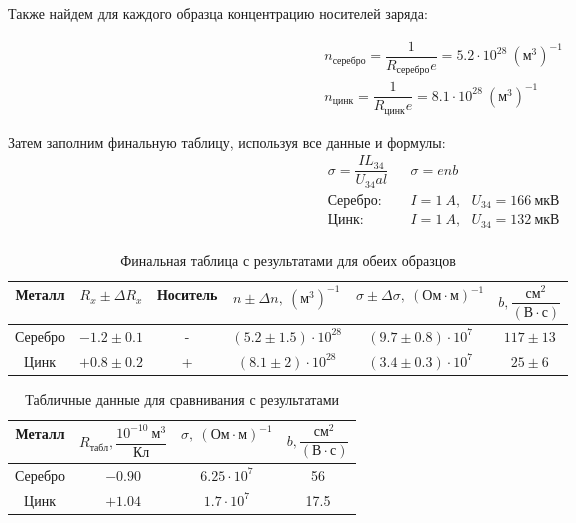 \documentclass{lab}
\begin{document}
\begin{itemize}
Также найдем для каждого образца концентрацию носителей заряда:

\begin{equation}
\begin{aligned}
	&n_{серебро} = \dfrac{1}{R_{серебро}e} = 5.2 \cdot 10^{28}~(м^{3})^{-1}\\
	&n_{цинк} = \dfrac{1}{R_{цинк}e} = 8.1 \cdot 10^{28}~(м^{3})^{-1}
\end{aligned}
\end{equation}

Затем заполним финальную таблицу, используя все данные и формулы:
\begin{equation}
\begin{aligned}
	&\sigma = \dfrac{IL_{34}}{U_{34}al}	&\sigma = enb\\
	&Серебро: ~~~~~ &I = 1~A, ~~~ U_{34} = 166~мкВ\\
	&Цинк: ~~~~~ 	&I = 1~A, ~~~ U_{34} = 132~мкВ\\
\end{aligned}
\end{equation}
\vspace{-0.5cm}
\begin{table}[H]
	\centering
	\renewcommand{\arraystretch}{2.1}
	\begin{tabular}{|c||c|c|c|c|c|}
		\hline
		Металл	& $ R_x \pm \Delta R_x $	& Носитель	& $ n \pm \Delta n,~(м^{3})^{-1} $	
			& $ \sigma \pm \Delta \sigma,~(Ом \cdot м)^{-1} $	& $ b, \dfrac{см^2}{(В \cdot с)} $	\\ \hline
		Серебро	& $-1.2 \pm 0.1$			& -			& $(5.2 \pm 1.5) \cdot 10^{28}$
			& $ (9.7 \pm 0.8) \cdot 10^7 $						& $117 \pm 13$ 						\\ \hline
		Цинк	& $+0.8 \pm 0.2$			& +			& $(8.1 \pm 2) \cdot 10^{28}$
			& $ (3.4 \pm 0.3) \cdot 10^7 $						& $25 \pm 6$ 						\\ \hline
	\end{tabular}
	\renewcommand{\arraystretch}{1}
	\caption{\footnotesize Финальная таблица с результатами для обеих образцов}
	\label{tabfinal}
\end{table}
\vspace{-0.5cm}
\begin{table}[H]
	\centering
	\renewcommand{\arraystretch}{2.1}
		\begin{tabular}{|c||c|c|c|}
			\hline
			Металл	& $ R_{табл}, \dfrac{10^{-10}~м^3}{Кл} $	& $ \sigma,~(Ом \cdot м)^{-1} $	& $ b, \dfrac{см^2}{(В \cdot с)} $	\\ \hline
			Серебро	& $-0.90$									& $6.25 \cdot 10^7$				& 56								\\ \hline
			Цинк	& $+1.04$									& $1.7 \cdot 10^7$				& 17.5 								\\ \hline
		\end{tabular}
	\renewcommand{\arraystretch}{1}
	\caption{\footnotesize Табличные данные для сравнивания с результатами}
	\label{tabl}
\end{table}

\end{itemize}
\end{document}
